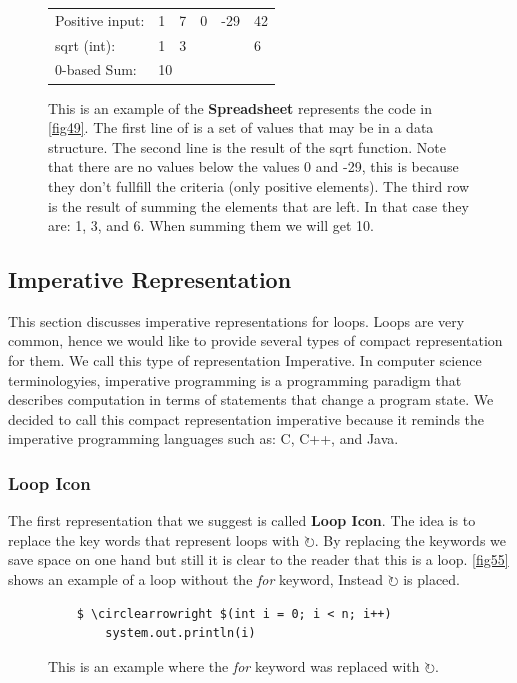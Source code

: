 \begin{figure}[H]
	\begin{table}[H]
		\centering
		\begin{tabular}{llllll}
			Positive input: & 1  & 7  & 0 & -29 & 42 \\
			sqrt (int):     & 1  & 3  &   &     & 6  \\ \hline
			0-based Sum:    & \multicolumn{5}{l}{10} \\
		\end{tabular}
	\end{table}
	\caption{This is an example of the \textbf{Spreadsheet} represents the code in \autoref{fig49}. The first line of is a set of values that may be in a data structure. The second line is the result of the sqrt function. Note that there are no values below the values 0 and -29, this is because they don't fullfill the criteria (only positive elements). The third row is the result of summing the elements that are left. In that case they are: 1, 3, and 6. When summing them we will get 10.}
	\label{fig54}
\end{figure}
\subsection{Imperative Representation}
This section discusses imperative representations for loops. Loops are very common, hence we would like to provide several types of compact representation for them. We call this type of representation Imperative. In computer science terminologyies, imperative programming is a programming paradigm that describes computation in terms of statements that change a program state. We decided to call this compact representation imperative because it reminds the imperative programming languages such as: C, C++, and Java.

\subsubsection{Loop Icon}
The first representation that we suggest is called \textbf{Loop Icon}. The idea is to replace the key words that represent loops with $ \circlearrowright $. By replacing the keywords we save space on one hand but still it is clear to the reader that this is a loop. \autoref{fig55} shows an example of a loop without the \textit{for} keyword, Instead $ \circlearrowright $ is placed.
\begin{figure}[H]
	\begin{lstlisting}
	$ \circlearrowright $(int i = 0; i < n; i++)
		system.out.println(i)
	\end{lstlisting}
	\caption{This is an example where the \textit{for} keyword was replaced with $ \circlearrowright $.}
	\label{fig55}
\end{figure}
